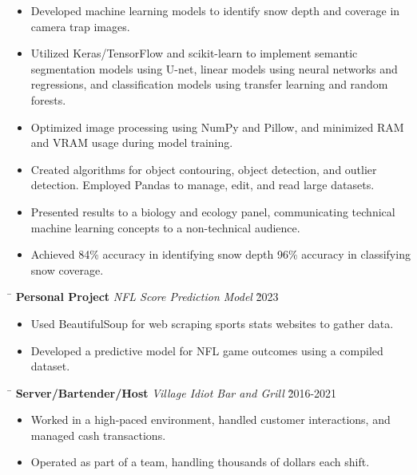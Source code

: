 \documentclass[a4paper,11pt]{article}
\def\locationh{\hspace{7cm}}
\def\subsectionv{\vspace{-5.3ex}}
\def\postpointsv{\vspace{0cm}}
\def\betweenjobsv{\vspace{0.4cm}}
\begin{document}
\begin{itemize}[leftmargin=.5cm, itemsep=.1cm, before=\subsectionv, after=\postpointsv]
    \item Developed machine learning models to identify snow depth and coverage in camera trap images.
    \item Utilized Keras/TensorFlow and scikit-learn to implement semantic segmentation models using U-net, linear models using neural networks and regressions, and classification models using transfer learning and random forests.
    \item Optimized image processing using NumPy and Pillow, and minimized RAM and VRAM usage during model training.
    \item Created algorithms for object contouring, object detection, and outlier detection. Employed Pandas to manage, edit, and read large datasets.
    \item Presented results to a biology and ecology panel, communicating technical machine learning concepts to a non-technical audience.
    \item Achieved 84\% accuracy in identifying snow depth 96\% accuracy in classifying snow coverage.
\end{itemize}

\betweenjobsv

\begin{tabbing}
    \locationh \= \kill
    \textbf{Personal Project} \> \textit{NFL Score Prediction Model} \` 2023 \\
\end{tabbing}

\begin{itemize}[leftmargin=.5cm, itemsep=.1cm, before=\subsectionv, after=\postpointsv]
    \item Used BeautifulSoup for web scraping sports stats websites to gather data.
    \item Developed a predictive model for NFL game outcomes using a compiled dataset.
\end{itemize}

\betweenjobsv

\begin{tabbing}
    \locationh \= \kill
    \textbf{Server/Bartender/Host} \> \textit{Village Idiot Bar and Grill} \` 2016-2021 \\
\end{tabbing}

\begin{itemize}[leftmargin=.5cm, itemsep=.1cm, before=\subsectionv, after=\postpointsv]
    \item Worked in a high-paced environment, handled customer interactions, and managed cash transactions.
    \item Operated as part of a team, handling thousands of dollars each shift.
\end{itemize}
\end{document}
